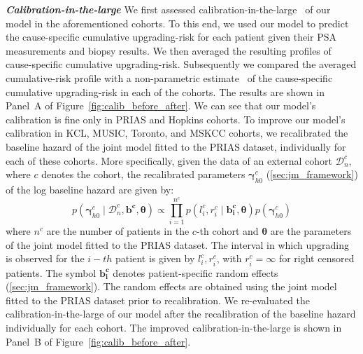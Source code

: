 \textbf{\textit{Calibration-in-the-large}}
We first assessed calibration-in-the-large~\citep{steyerberg2010assessing} of our model in the aforementioned cohorts. To this end, we used our model to predict the cause-specific cumulative upgrading-risk for each patient given their PSA measurements and biopsy results. We then averaged the resulting profiles of cause-specific cumulative upgrading-risk. Subsequently we compared the averaged cumulative-risk profile with a non-parametric estimate~\citep{turnbull1976empirical} of the cause-specific cumulative upgrading-risk in each of the cohorts. The results are shown in Panel~A of Figure~\ref{fig:calib_before_after}. We can see that our model's calibration is fine only in PRIAS and Hopkins cohorts. To improve our model's calibration in KCL, MUSIC, Toronto, and MSKCC cohorts, we recalibrated the baseline hazard of the joint model fitted to the PRIAS dataset, individually for each of these cohorts. More specifically, given the data of an external cohort $\mathcal{D}_n^c$, where $c$ denotes the cohort, the recalibrated parameters $\boldsymbol{\gamma}_{h0}^c$ (\ref{sec:jm_framework}) of the log baseline hazard are given by:
\begin{equation}
p(\boldsymbol{\gamma}_{h0}^c \mid \mathcal{D}_n^c, \boldsymbol{b^c},  \boldsymbol{\theta}) \propto  \prod_{i=1}^{n^c} p(l_i^c, r_i^c \mid \boldsymbol{b^c_i}, \boldsymbol{\theta}) p(\boldsymbol{\gamma}_{h0}^c)
\end{equation}
where $n^c$ are the number of patients in the $c$-th cohort and $\boldsymbol{\theta}$ are the parameters of the joint model fitted to the PRIAS dataset. The interval in which upgrading is observed for the $i-th$ patient is given by $l_i^c, r_i^c$, with $r_i^c = \infty$ for right censored patients. The symbol $\boldsymbol{b^c_i}$ denotes patient-specific random effects (\ref{sec:jm_framework}). The random effects are obtained using the joint model fitted to the PRIAS dataset prior to recalibration. We re-evaluated the calibration-in-the-large of our model after the recalibration of the baseline hazard individually for each cohort. The improved calibration-in-the-large is shown in Panel~B of Figure~\ref{fig:calib_before_after}.


